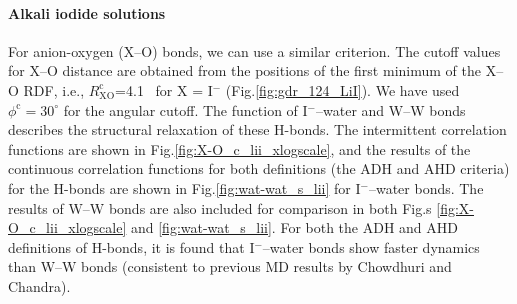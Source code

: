 \paragraph{Alkali iodide solutions}\label{PARAGRAPH_I--W}
For anion-oxygen (X--O) bonds, we can use a similar criterion. The cutoff values for X--O distance are obtained from the positions of the first
minimum of the X--O RDF, i.e., $R_\text{XO}^\text{c}$=4.1 \A\ for X = I$^-$ (Fig.\thinspace\ref{fig:gdr_124_LiI}). We have used $\phi^\text{c} = 30^{\circ}$ for the angular cutoff\cite{Chowdhuri2006}.
The function \CHB of I$^-$--water and W--W bonds describes the structural relaxation of these H-bonds. 
The intermittent correlation functions \CHB are shown in Fig.\thinspace\ref{fig:X-O_c_lii_xlogscale}, and
the results of the continuous correlation functions for both definitions (the ADH and AHD criteria) for the H-bonds are shown in Fig.\thinspace\ref{fig:wat-wat_s_lii} 
for I$^-$--water bonds. The results of W--W bonds are also included for comparison in both Fig.s \ref{fig:X-O_c_lii_xlogscale} 
and \thinspace\ref{fig:wat-wat_s_lii}.
For both the ADH and AHD definitions of H-bonds, it is found that I$^-$--water bonds show faster dynamics than W--W bonds 
\cite{Chowdhuri2006} (consistent to previous MD results by Chowdhuri and Chandra).

